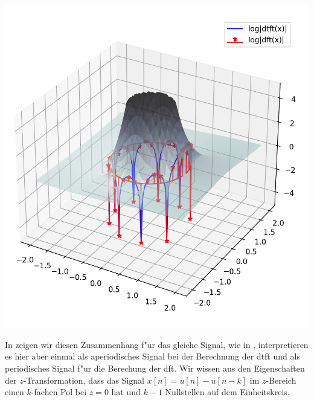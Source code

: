 \begin{listing}[ht]
    \noindent
    \begin{minipage}{0.51\textwidth}
        \strut\vspace*{-\baselineskip}\newline
        \inputminted[firstline=5, lastline=46]{python3}{code/dtft_z.py}
    \end{minipage}%
    \begin{minipage}{0.48\textwidth}
        \strut\vspace*{-\baselineskip}\newline
        \includegraphics[width=\textwidth]{code/dtft_z.png}
    \end{minipage}
    \label{py:dtft_z}
\end{listing}

In  zeigen wir diesen Zusammenhang f"ur das gleiche Signal, wie in , interpretieren es hier aber einmal als aperiodisches Signal bei der Berechnung der \gls{dtft} und als periodisches Signal f"ur die Berechung der \gls{dft}.
Wir wissen aus den Eigenschaften der $z$-Transformation, dass das Signal $x[n] = u[n] - u[n-k]$ im $z$-Bereich einen $k$-fachen Pol bei $z = 0$ hat und $k-1$ Nullstellen auf dem Einheitskreis.

